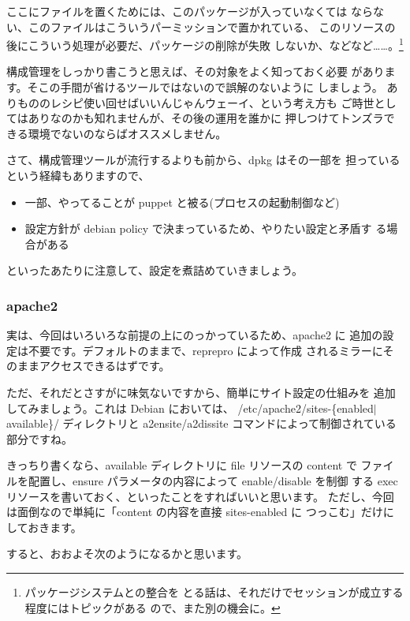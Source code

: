 \documentclass[mingoth,a4paper]{jsarticle}
\begin{document}
ここにファイルを置くためには、このパッケージが入っていなくては
ならない、このファイルはこういうパーミッションで置かれている、
このリソースの後にこういう処理が必要だ、パッケージの削除が失敗
しないか、などなど……。\footnote{パッケージシステムとの整合を
とる話は、それだけでセッションが成立する程度にはトピックがある
ので、また別の機会に。}

構成管理をしっかり書こうと思えば、その対象をよく知っておく必要
があります。そこの手間が省けるツールではないので誤解のないように
しましょう。
ありもののレシピ使い回せばいいんじゃんウェーイ、という考え方も
ご時世としてはありなのかも知れませんが、その後の運用を誰かに
押しつけてトンズラできる環境でないのならばオススメしません。

さて、構成管理ツールが流行するよりも前から、dpkg はその一部を
担っているという経緯もありますので、

\begin{itemize}
\item 一部、やってることが puppet と被る(プロセスの起動制御など)
\item 設定方針が debian policy で決まっているため、やりたい設定と矛盾す
る場合がある
\end{itemize}

といったあたりに注意して、設定を煮詰めていきましょう。

\subsubsection{apache2}

実は、今回はいろいろな前提の上にのっかっているため、apache2 に
追加の設定は不要です。デフォルトのままで、reprepro によって作成
されるミラーにそのままアクセスできるはずです。

ただ、それだとさすがに味気ないですから、簡単にサイト設定の仕組みを
追加してみましょう。これは Debian においては、
/etc/apache2/sites-\{enabled$|$available\}/ ディレクトリと
a2ensite/a2dissite コマンドによって制御されている部分ですね。

きっちり書くなら、available ディレクトリに file リソースの content で
ファイルを配置し、ensure パラメータの内容によって enable/disable を制御
する exec リソースを書いておく、といったことをすればいいと思います。
ただし、今回は面倒なので単純に「content の内容を直接 sites-enabled に
つっこむ」だけにしておきます。

すると、おおよそ次のようになるかと思います。

\end{document}
